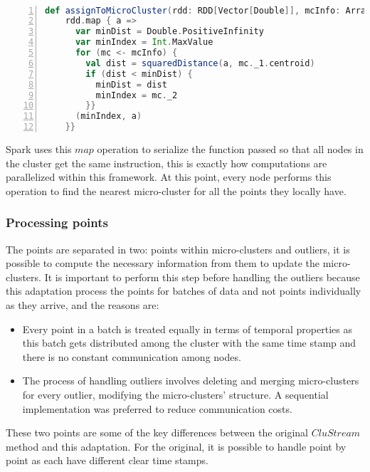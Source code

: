 \
\begin{lstlisting}[language=Scala, tabsize=2, breaklines=true,basicstyle=\footnotesize,frame=lines,numbers=left]
def assignToMicroCluster(rdd: RDD[Vector[Double]], mcInfo: Array[(MicroClusterInfo, Int)]): RDD[(Int, Vector[Double])] = {
    rdd.map { a =>
      var minDist = Double.PositiveInfinity
      var minIndex = Int.MaxValue
      for (mc <- mcInfo) {
        val dist = squaredDistance(a, mc._1.centroid)
        if (dist < minDist) {
          minDist = dist
          minIndex = mc._2
        }}
      (minIndex, a)
    }}
\end{lstlisting}


Spark uses this $map$ operation to serialize the function passed so that all nodes in the cluster get the same instruction, this is exactly how computations are parallelized  within this framework. At this point, every node performs this operation to find the nearest micro-cluster for all the points they locally have.



\subsubsection{Processing points}\label{procpoints}

The points are separated in two: points within micro-clusters and outliers, it is possible to compute the necessary information from them to update the micro-clusters. It is important to perform this step before handling the outliers because this adaptation process the points for batches of data and not points individually as they arrive, and the reasons are:

\begin{itemize}
 \item Every point in a batch is treated equally in terms of temporal properties as this batch gets distributed among the cluster with the same time stamp and there is no constant communication among nodes.
\item The process of handling outliers involves deleting and merging micro-clusters for every outlier, modifying the micro-clusters' structure. A sequential implementation was preferred to reduce communication costs.
\end{itemize}

These two points are some of the key differences between the original $CluStream$ method and this adaptation. For the original, it is possible to handle point by point as each have different clear time stamps.


